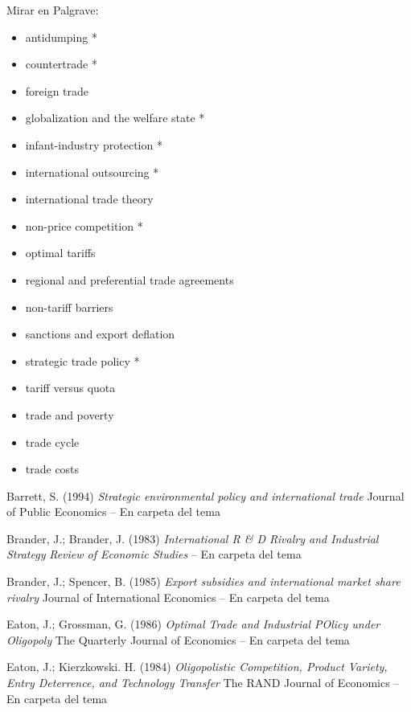 \documentclass{nuevotema}
\begin{document}
Mirar en Palgrave:
\begin{itemize}
	\item antidumping *
	\item countertrade *
	\item foreign trade
	\item globalization and the welfare state *
	\item infant-industry protection *
	\item international outsourcing *
	\item international trade theory
	\item non-price competition *
	\item optimal tariffs
	\item regional and preferential trade agreements
	\item non-tariff barriers
	\item sanctions and export deflation
	\item strategic trade policy *
	\item tariff versus quota
	\item trade and poverty
	\item trade cycle
	\item trade costs
\end{itemize}

Barrett, S. (1994) \textit{Strategic environmental policy and international trade} Journal of Public Economics -- En carpeta del tema

Brander, J.; Brander, J. (1983) \textit{International R \& D Rivalry and Industrial Strategy} \textit{Review of Economic Studies} -- En carpeta del tema

Brander, J.; Spencer, B. (1985) \textit{Export subsidies and international market share rivalry} Journal of International Economics  -- En carpeta del tema


Eaton, J.; Grossman, G. (1986) \textit{Optimal Trade and Industrial POlicy under Oligopoly} The Quarterly Journal of Economics -- En carpeta del tema

Eaton, J.; Kierzkowski. H. (1984) \textit{Oligopolistic Competition, Product Variety, Entry Deterrence, and Technology Transfer} The RAND Journal of Economics -- En carpeta del tema
\end{document}
